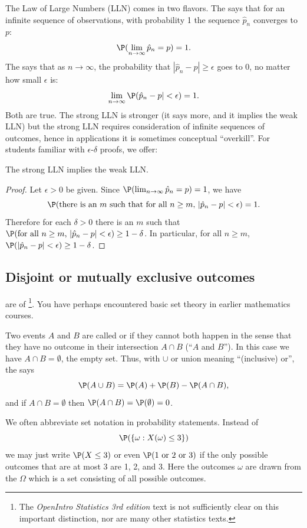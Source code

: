 The Law of Large Numbers (LLN) comes in two flavors. The  says that for an infinite sequence of observations, with probability 1 the sequence $\hat p_n$ converges to $p$:
\[
	\P(\lim_{n\to\infty}\hat p_n = p) = 1.
\]
The  says that as $n\to\infty$, the probability that $|\hat p_n-p|\ge\epsilon$ goes to 0, no matter how small $\epsilon$ is:
\[
	\lim_{n\to\infty}\P(\hat p_n-p|<\epsilon) = 1.
\]
Both are true. The strong LLN is stronger (it says more, and it implies the weak LLN) but the strong LLN requires consideration of infinite sequences of outcomes, hence in applications it is sometimes conceptual ``overkill''.
For students familiar with $\epsilon$-$\delta$ proofs, we offer:
\begin{thm}
The strong LLN implies the weak LLN.
\end{thm}
\begin{proof}
Let $\epsilon>0$ be given. Since $\P(\lim_{n\to\infty}\hat p_n = p) = 1$,
we have
\[
	\P(\text{there is an $m$ such that for all $n\ge m$, $|\hat p_n-p|<\epsilon$})=1.
\]
Therefore for each $\delta>0$ there is an $m$ such that
$\P(\text{for all $n\ge m$, $|\hat p_n-p|<\epsilon$})\ge 1-\delta$. In particular, for all $n\ge m$, $\P(|\hat p_n-p|<\epsilon)\ge 1-\delta$.
\end{proof}


\subsection{Disjoint or mutually exclusive outcomes}


 are  of \footnote{The \emph{OpenIntro Statistics 3rd edition} text is not sufficiently clear on this important distinction, nor are many other statistics texts.}. You have perhaps encountered basic set theory in earlier mathematics courses.

Two events $A$ and $B$ are called  or  if they cannot both happen in the sense that they have no outcome in their intersection $A\cap B$ (``$A$ and $B$'').
In this case we have $A\cap B=\emptyset$, the empty set. Thus, with $\cup$ or union meaning ``(inclusive) or'', the  says
\[
	\P(A\cup B) = \P(A) + \P(B) - \P(A\cap B),
\]
and if $A\cap B=\emptyset$ then $\P(A\cap B)=\P(\emptyset)=0$.

We often abbreviate set notation in probability statements. Instead of
\[
	\P(\{\omega: X(\omega)\le 3\})
\]
we may just write $\P(X\le 3)$ or even $\P(1\text{ or }2\text{ or }3)$ if the only possible outcomes that are at most 3 are 1, 2, and 3.
Here the outcomes $\omega$ are drawn from the  $\Omega$ which is a set consisting of all possible outcomes.


